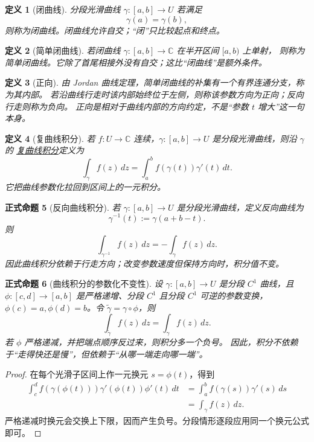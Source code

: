 \documentclass[UTF8,fontset=none,a4paper,11pt]{ctexart}
\theoremstyle{foundation-definition}
\newtheorem{definition}{定义}[section]
\theoremstyle{foundation-theorem}
\theoremstyle{foundation-proposition}
\newtheorem{proposition}[definition]{正式命题}
\theoremstyle{foundation-example}
\theoremstyle{foundation-remark}
\theoremstyle{foundation-theorem}
\newcommand{\C}{\mathbb C}
\newcommand{\term}[2]{\hyperref[#1]{#2}}
\begin{document}
\begin{definition}[闭曲线]\label{def:complex-closed-curve}
分段光滑曲线 \(\gamma:[a,b]\to U\) 若满足
\[
\gamma(a)=\gamma(b),
\]
则称为闭曲线。闭曲线允许自交；“闭”只比较起点和终点。
\end{definition}

\begin{definition}[简单闭曲线]\label{def:simple-closed-curve}
若闭曲线 \(\gamma:[a,b]\to\mathbb C\) 在半开区间 \([a,b)\) 上单射，
则称为简单闭曲线。它除了首尾相接外没有自交；这比“闭曲线”是额外条件。
\end{definition}

\begin{definition}[正向]\label{def:positive-orientation}
由 Jordan 曲线定理，简单闭曲线的补集有一个有界连通分支，称为其内部。
若沿曲线行走时该内部始终位于左侧，则称该参数方向为正向；反向行走则称为负向。
正向是相对于曲线内部的方向约定，不是“参数 \(t\) 增大”这一句本身。
\end{definition}

\begin{definition}[复曲线积分]\label{def:complex-line-integral}
若 \(f:U\to\C\) 连续，\(\gamma:[a,b]\to U\) 是分段光滑曲线，则沿 \(\gamma\) 的
\term{def:complex-line-integral}{复曲线积分}定义为
\[
\int_\gamma f(z)\,dz
=\int_a^b f(\gamma(t))\gamma'(t)\,dt.
\]
它把曲线参数化拉回到区间上的一元积分。
\end{definition}

\begin{proposition}[反向曲线积分]\label{prop:reverse-curve-integral}
若 \(\gamma:[a,b]\to U\) 是分段光滑曲线，定义反向曲线为
\[
\gamma^{-1}(t):=\gamma(a+b-t).
\]
则
\[
\int_{\gamma^{-1}}f(z)\,dz=-\int_\gamma f(z)\,dz.
\]
因此曲线积分依赖于行走方向；改变参数速度但保持方向时，积分值不变。
\end{proposition}

\begin{proposition}[曲线积分的参数化不变性]\label{prop:curve-integral-reparam}
设 \(\gamma:[a,b]\to U\) 是分段 \(C^1\) 曲线，且
\(\phi:[c,d]\to[a,b]\) 是严格递增、分段 \(C^1\) 且分段 \(C^1\) 可逆的参数变换，
\(\phi(c)=a,\phi(d)=b\)。令 \(\widetilde\gamma=\gamma\circ\phi\)，则
\[
\int_{\widetilde\gamma} f(z)\,dz=\int_\gamma f(z)\,dz.
\]
若 \(\phi\) 严格递减，并把端点顺序反过来，则积分多一个负号。
因此，积分不依赖于“走得快还是慢”，但依赖于“从哪一端走向哪一端”。
\end{proposition}

\begin{proof}
在每个光滑子区间上作一元换元 \(s=\phi(t)\)，得到
\[
\begin{aligned}
\int_c^d f(\gamma(\phi(t)))\gamma'(\phi(t))\phi'(t)\,dt
&=\int_a^b f(\gamma(s))\gamma'(s)\,ds\\
&=\int_\gamma f(z)\,dz.
\end{aligned}
\]
严格递减时换元会交换上下限，因而产生负号。分段情形逐段应用同一个换元公式即可。
\end{proof}
\end{document}
